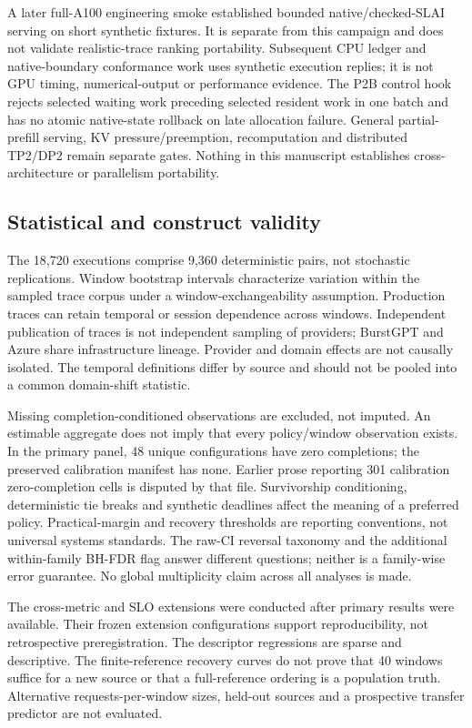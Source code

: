 A later full-A100 engineering smoke established bounded native/checked-SLAI
serving on short synthetic fixtures. It is separate from this campaign and
does not validate realistic-trace ranking portability. Subsequent CPU ledger
and native-boundary conformance work uses synthetic execution replies;
it is not GPU timing, numerical-output or performance evidence. The P2B
control hook rejects selected waiting work preceding selected resident
work in one batch and has no atomic native-state rollback on late allocation
failure. General partial-prefill serving, KV pressure/preemption,
recomputation and distributed TP2/DP2 remain separate gates. Nothing in
this manuscript establishes cross-architecture or parallelism portability.

\subsection{Statistical and construct validity}
The 18,720 executions comprise 9,360 deterministic pairs, not stochastic
replications. Window bootstrap intervals characterize variation within the
sampled trace corpus under a window-exchangeability assumption. Production
traces can retain temporal or session dependence across windows. Independent
publication of traces is not independent sampling of providers; BurstGPT and
Azure share infrastructure lineage. Provider and domain effects are not
causally isolated. The temporal definitions differ by source and should
not be pooled into a common domain-shift statistic.

Missing completion-conditioned observations are excluded, not imputed.
An estimable aggregate does not imply that every policy/window observation
exists. In the primary panel, 48 unique configurations have zero completions;
the preserved calibration manifest has none. Earlier prose reporting 301 calibration zero-completion cells is disputed by that file. Survivorship
conditioning, deterministic tie breaks and synthetic deadlines affect the
meaning of a preferred policy. Practical-margin and recovery thresholds
are reporting conventions, not universal systems standards. The raw-CI
reversal taxonomy and the additional within-family BH-FDR flag answer
different questions; neither is a family-wise error guarantee. No global
multiplicity claim across all analyses is made.

The cross-metric and SLO extensions were conducted after primary results
were available. Their frozen extension configurations support reproducibility,
not retrospective preregistration. The descriptor regressions are sparse
and descriptive. The finite-reference recovery curves do not prove that
40 windows suffice for a new source or that a full-reference ordering is a
population truth. Alternative requests-per-window sizes, held-out sources
and a prospective transfer predictor are not evaluated.

